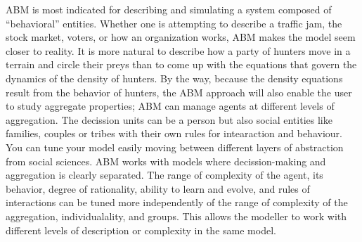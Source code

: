 \documentclass[11pt,oneside,a4paper,openright]{report}
\begin{document}
ABM is most indicated for describing and simulating a system composed of “behavioral” entities. Whether one is attempting to describe a traffic jam, the stock market, voters, or how an organization works, ABM makes the model seem closer to reality. It is more natural to describe how a party of hunters move in a terrain and circle their preys than to come up with the equations that govern the dynamics of the density of hunters. By the way, because the density equations result from the behavior of hunters, the ABM approach will also enable the user to study aggregate properties\cite[p.2]{Bonabeau2002}; ABM can manage agents at different levels of aggregation. The decission units can be a person but also social entities like families, couples or tribes with their own rules for intearaction and behaviour. You can tune your model easily moving between different layers of abstraction from social sciences. ABM works with models where decission-making and aggregation is clearly separated. The range of complexity of the agent, its behavior, degree of rationality, ability to learn and evolve, and rules of interactions can be tuned more independently of the range of complexity of the aggregation, individualality, and groups. This allows the modeller to work with different levels of description or complexity in the same model\cite[p.2]{Bonabeau2002}.
\end{document}
